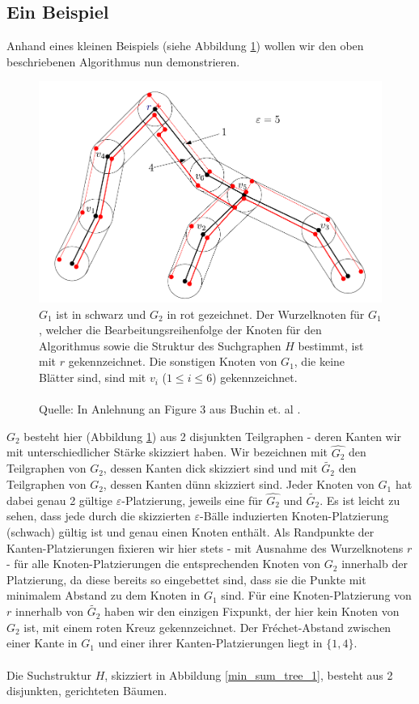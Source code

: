 \documentclass[a4paper, 12pt, twoside]{article}
\theoremstyle{Format1} %
\begin{document}
\subsection{Ein Beispiel}
Anhand eines kleinen Beispiels (siehe Abbildung \ref{min_sum_tree_0}) wollen wir den oben beschriebenen Algorithmus nun demonstrieren.

\begin{figure}[H]
    \includegraphics[width=\textwidth]{min_sum_tree_0.pdf}
	\caption{
	$G_1$ ist in schwarz und $G_2$ in rot gezeichnet. Der Wurzelknoten für $G_1$, welcher die Bearbeitungsreihenfolge der Knoten für den Algorithmus sowie die Struktur
	des Suchgraphen $H$ bestimmt, ist mit $r$ gekennzeichnet. Die sonstigen Knoten von $G_1$, die keine Blätter sind, sind mit $v_i$ ($1 \leq i \leq 6$) gekennzeichnet.
	\\
	\\
	Quelle: In Anlehnung an Figure 3 aus Buchin et. al \cite{Buchin}.
	}
    \label{min_sum_tree_0}
\end{figure}

$G_2$ besteht hier (Abbildung \ref{min_sum_tree_0}) aus 2 disjunkten Teilgraphen - deren Kanten wir mit unterschiedlicher Stärke skizziert haben.
Wir bezeichnen mit $\widehat{G_2}$ den Teilgraphen von $G_2$, dessen Kanten dick skizziert sind und mit $\widetilde{G_2}$ den Teilgraphen von $G_2$, dessen Kanten dünn skizziert sind.
Jeder Knoten von $G_1$ hat dabei genau 2 gültige $\varepsilon$-Platzierung, jeweils eine für $\widehat{G_2}$ und $\widetilde{G_2}$.
Es ist leicht zu sehen, dass jede durch die skizzierten $\varepsilon$-Bälle induzierten Knoten-Platzierung (schwach) gültig ist und genau einen Knoten enthält.
Als Randpunkte der Kanten-Platzierungen fixieren wir hier stets - mit Ausnahme des Wurzelknotens $r$ - für alle Knoten-Platzierungen die entsprechenden Knoten von $G_2$ innerhalb der Platzierung,
da diese bereits so eingebettet sind, dass sie die Punkte mit minimalem Abstand zu dem Knoten in $G_1$ sind. Für eine Knoten-Platzierung von $r$ innerhalb von $\widetilde{G_2}$
haben wir den einzigen Fixpunkt, der hier kein Knoten von $G_2$ ist, mit einem roten Kreuz gekennzeichnet.
Der Fréchet-Abstand zwischen einer Kante in $G_1$ und einer ihrer Kanten-Platzierungen liegt in $\{1,4\}$.
\\
\\
Die Suchstruktur $H$, skizziert in Abbildung \ref{min_sum_tree_1}, besteht aus 2 disjunkten, gerichteten Bäumen.
\end{document}
